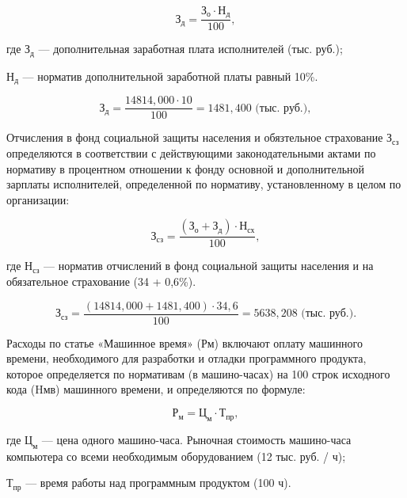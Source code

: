 \begin{equation}
  \text{З}_{\text{д}} = \frac{ \text{З}_{\text{о}} \cdot \text{Н}_{\text{д}} } { 100 },
\end{equation}

где \(\text{З}_{\text{д}}\) --- дополнительная заработная плата исполнителей (тыс. руб.);
 
\(\text{Н}_{\text{д}}\) --- норматив дополнительной заработной платы равный 10\%.

\begin{equation}
  \text{З}_{\text{д}} = \frac{ 14814,000 \cdot 10 } { 100 } = 1481,400 \text{ (тыс. руб.)},
\end{equation}

Отчисления в фонд социальной защиты населения и обязтельное страхование \( \text{З}_{\text{сз}} \) определяются в соответствии с действующими законодательными актами по нормативу в процентном отношении к фонду основной и дополнительной зарплаты исполнителей, определенной по нормативу, установленному в целом по организации:

\begin{equation}
  \text{З}_{\text{сз}} = \frac{ (\text{З}_{\text{о}} + \text{З}_{\text{д}}) \cdot \text{Н}_{\text{сх}}  } { 100},
\end{equation}

где \(\text{Н}_{\text{сз}}\) --- норматив отчислений в фонд социальной защиты населения  и на обязательное страхование (34 + 0,6\%).

\begin{equation}
  \text{З}_{\text{сз}} = \frac{ (14814,000 + 1481,400) \cdot 34,6  } { 100 } = 5638,208 \text{ (тыс. руб.)}.
\end{equation}

Расходы по статье «Машинное время» (Рм) включают оплату машинного времени, необходимого для разработки и отладки программного продукта, которое определяется по нормативам (в машино-часах) на 100 строк исходного кода (Hмв) машинного времени, и определяются по формуле:

\begin{equation}
  \text{Р}_{\text{м}} = \text{Ц}_{\text{м}} \cdot \text{Т}_{\text{пр}},
\end{equation}

где \(\text{Ц}_{\text{м}}\) --- цена одного машино-часа. Рыночная стоимость машино-часа компьютера со всеми необходимым оборудованием (12 тыс. руб. / ч);

\(\text{Т}_{\text{пр}}\) --- время работы над программным продуктом (100 ч).


